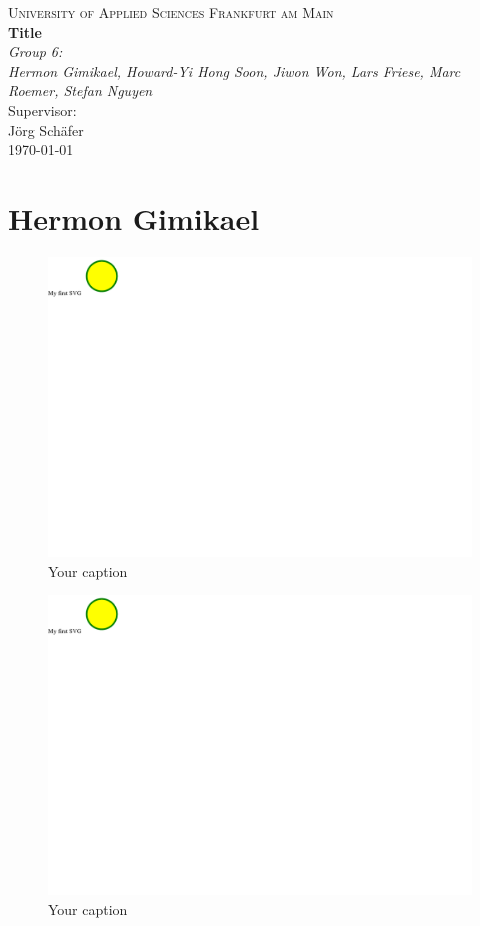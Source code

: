 \documentclass{article}
\begin{document}
\begin{titlepage}
    \centering
    \vspace*{0cm}
    {\scshape\Large University of Applied Sciences Frankfurt am Main}\\[2.5cm]
    {\huge\bfseries Title}\\[5cm]
    {\Large\itshape Group 6:}\\
    {\Large\itshape Hermon Gimikael, Howard-Yi Hong Soon, Jiwon Won, Lars Friese, Marc Roemer, Stefan Nguyen}\\[4cm]
    Supervisor:\\
    Jörg Schäfer\\[3cm]
    {\large \today}
\end{titlepage}

\tableofcontents
\newpage

\section{Hermon Gimikael}
\begin{figure}[h!]
    \centering
    \captionsetup{labelformat=empty}
    \caption{Your caption}
    \includegraphics[width=\textwidth, angle=0]{Kreis2.pdf}
\end{figure}
\newpage
\begin{figure}[h!]
    \centering
    \captionsetup{labelformat=empty}
    \caption{Your caption}
    \includegraphics[width=\textwidth, angle=0]{Kreis2.pdf}
\end{figure}
\newpage
\end{document}
